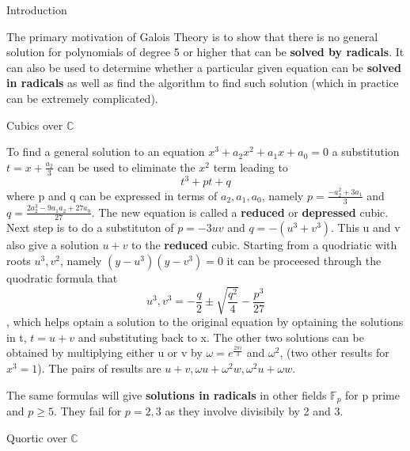 \documentclass[12pt, letterpaper]{article}
\newcommand{\C}{\mathbb{C}}
\newcommand{\F}{\mathbb{F}}
\begin{document}
\begin{section}{Introduction}

  The primary motivation of Galois Theory is to show that there is no general
  solution for polynomials of degree 5 or higher that can be \textbf{solved by
    radicals}. It can also be used to determine whether a particular given
  equation can be \textbf{solved in radicals} as well as find the algorithm to
  find such solution (which in practice can be extremely complicated).

  \begin{subsection}{Cubics over \(\C\)}

    To find a general solution to an equation
    \(x^{3} + a_{2}x^{2} + a_{1}x + a_{0} = 0\) a substitution
    \(t = x + \frac{a_{2}}{3}\) can be used to eliminate the \(x^{2}\) term
    leading to \[t^{3} + pt + q\] where p and q can be expressed in terms of
    \(a_{2}, a_{1}, a_{0}\), namely \(p = \frac{-a^{2}_{2} + 3a_{1}}{3}\) and
    \(q = \frac{2a^{3}_{2} -9a_{1}a_{2} + 27a_{0}}{27}\). The new equation is
    called a \textbf{reduced} or \textbf{depressed} cubic. Next step is to do a
    substituton of \(p = -3uv\) and \(q = -(u^{3} + v^{3})\). This u and v also
    give a solution \(u + v\) to the \textbf{reduced} cubic. Starting from a
    quodriatic with roots \(u^{3}, v^{2}\), namely
    \((y - u^{3})(y - v^{3}) = 0\) it can be proceesed through the quodratic
    formula
    that \[u^{3}, v^{3} = -\frac{q}{2} \pm \sqrt{\frac{q^{2}}{4}} - \frac{p^{3}}{27}\],
    which helps optain a solution to the original equation by optaining the
    solutions in t, \(t = u + v\) and substituting back to x. The other two
    solutions can be obtained by multiplying either u or v by
    \(\omega = e^{\frac{2\pi i}{3}}\) and \(\omega^{2}\), (two other results for
    \(x^{3} = 1\)). The pairs of results are
    \(u + v, \omega u + \omega^{2} w, \omega^{2} u + \omega w\).

    The same formulas will give \textbf{solutions in radicals} in other fields
    \(\F_{p}\) for p prime and \(p \geq 5\). They fail for \(p = 2, 3\)
    as they involve divisibily by 2 and 3.

  \end{subsection}

  \begin{subsection}{Quortic over \(\C\)}


\end{subsection}
\end{section}
\end{document}
